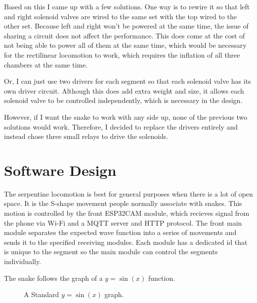 \documentclass[twoside]{article}
\begin{document}
Based on this I came up with a few solutions. One way is to rewire it so that left and right solenoid valves are wired to the same set with the top wired to the other set. Because left and right won't be powered at the same time, the issue of sharing a circuit does not affect the performance. This does come at the cost of not being able to power all of them at the same time, which would be necessary for the rectilinear locomotion to work, which requires the inflation of all three chambers at the same time.

Or, I can just use two drivers for each segment so that each solenoid valve has its own driver circuit. Although this does add extra weight and size, it allows each solenoid valve to be controlled independently, which is necessary in the design. 

However, if I want the snake to work with any side up, none of the previous two solutions would work. Therefore, I decided to replace the drivers entirely and instead chose three small relays to drive the solenoids.

\section{Software Design}
The serpentine locomotion is best for general purposes when there is a lot of open space. It is the S-shape movement people normally associate with snakes. 
This motion is controlled by the front ESP32CAM module, which recieves signal from the phone via Wi-Fi and a MQTT server and HTTP protocol. The front main module separates the expected wave function into a series of movements and sends it to the specified receiving modules. Each module has a dedicated id that is unique to the segment so the main module can control the segments individually. 

The snake follows the graph of a \(y=\sin(x)\) function.
\begin{figure} [H]
	\centering
	\caption{A Standard \(y=\sin(x)\) graph.}
\end{figure}
\end{document}

